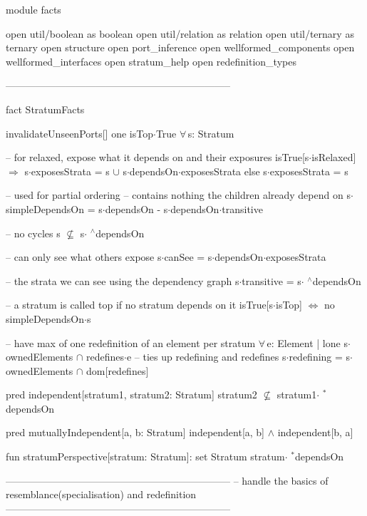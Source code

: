 module facts

open util/boolean as boolean
open util/relation as relation
open util/ternary as ternary
open structure
open port_inference
open wellformed_components
open wellformed_interfaces
open stratum_help
open redefinition_types

--------------------------------------------------------------------

fact StratumFacts
{
  invalidateUnseenPorts[]
  one isTop$\cdot$True
  $\forall\,$s: Stratum
  {
    -- for relaxed, expose what it depends on and their exposures
    isTrue[s$\cdot$isRelaxed] $\Longrightarrow$
      s$\cdot$exposesStrata = s $\cup$ s$\cdot$dependsOn$\cdot$exposesStrata
    else
      s$\cdot$exposesStrata = s

    -- used for partial ordering
    -- contains nothing the children already depend on
    s$\cdot$simpleDependsOn = s$\cdot$dependsOn -
      s$\cdot$dependsOn$\cdot$transitive

    -- no cycles
    s $\not\subseteq$ s$\cdot$ $\!\!\!^\wedge\!$dependsOn

    -- can only see what others expose
    s$\cdot$canSee = s$\cdot$dependsOn$\cdot$exposesStrata
  
    -- the strata we can see using the dependency graph
    s$\cdot$transitive = s$\cdot$ $\!\!\!^\wedge\!$dependsOn

    -- a stratum is called top if no stratum depends on it
    isTrue[s$\cdot$isTop] $\Longleftrightarrow$ no simpleDependsOn$\cdot$s
    
    -- have max of one redefinition of an element per stratum
    $\forall\,$e: Element |
      lone s$\cdot$ownedElements $\cap$ redefines$\cdot$e
    -- ties up redefining and redefines
    s$\cdot$redefining = s$\cdot$ownedElements $\cap$ dom[redefines]
  }
}

pred independent[stratum1, stratum2: Stratum]
{
  stratum2 $\not\subseteq$ stratum1$\cdot$ $\!\!\!^\ast\!$dependsOn
}

pred mutuallyIndependent[a, b: Stratum]
{
  independent[a, b] $\wedge$ independent[b, a]
}

fun stratumPerspective[stratum: Stratum]: set Stratum
{
  stratum$\cdot$ $\!\!\!^\ast\!$dependsOn
}

--------------------------------------------------------------------
-- handle the basics of resemblance(specialisation) and redefinition
--------------------------------------------------------------------

